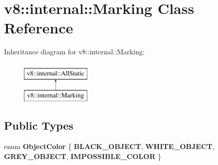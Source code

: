\hypertarget{classv8_1_1internal_1_1Marking}{}\section{v8\+:\+:internal\+:\+:Marking Class Reference}
\label{classv8_1_1internal_1_1Marking}
Inheritance diagram for v8\+:\+:internal\+:\+:Marking\+:\begin{figure}[H]
\begin{center}
\leavevmode
\includegraphics[height=2.000000cm]{classv8_1_1internal_1_1Marking}
\end{center}
\end{figure}
\subsection*{Public Types}
\begin{DoxyCompactItemize}
\item 
\mbox{\label{classv8_1_1internal_1_1Marking_abb68aeb41450ead5b0a8b01d53b6acfe}} 
enum {\bfseries Object\+Color} \{ {\bfseries B\+L\+A\+C\+K\+\_\+\+O\+B\+J\+E\+CT}, 
{\bfseries W\+H\+I\+T\+E\+\_\+\+O\+B\+J\+E\+CT}, 
{\bfseries G\+R\+E\+Y\+\_\+\+O\+B\+J\+E\+CT}, 
{\bfseries I\+M\+P\+O\+S\+S\+I\+B\+L\+E\+\_\+\+C\+O\+L\+OR}
 \}
\end{DoxyCompactItemize}
